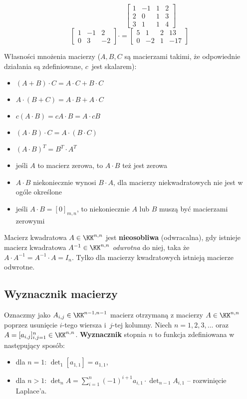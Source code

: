 $$
\hspace{6em} \begin{bmatrix}
    1 & -1 & 1 & 2 \\
    2 & 0 & 1 & 3 \\
    3 & 1 & 1 & 4
\end{bmatrix}
$$
$$
\begin{bmatrix}
    1 & -1 & 2 \\
    0 & 3 & -2
\end{bmatrix}\cdot = 
\begin{bmatrix}
    5 & 1 & 2 & 13 \\
    0 & -2 & 1 & -17
\end{bmatrix}
$$

Własności mnożenia macierzy ($A, B, C$ są macierzami takimi, że odpowiednie działania są zdefiniowane, $c$~jest skalarem):
\begin{itemize}
    \item $(A + B)\cdot C = A\cdot C + B \cdot C$
    \item $A\cdot(B+C)=A\cdot B + A\cdot C$
    \item $c(A\cdot B) = cA \cdot B = A \cdot cB$
    \item $(A\cdot B)\cdot C = A\cdot(B\cdot C)$
    \item $(A\cdot B)^T = B^T\cdot A^T$
    \item jeśli $A$ to macierz zerowa, to $A\cdot B$ też jest zerowa
    \item $A\cdot B$ niekoniecznie wynosi $B\cdot A$, dla macierzy niekwadratowych nie jest w ogóle określone
    \item jeśli $A\cdot B = [0]_{m,n}$, to niekoniecznie $A$ lub $B$ muszą być macierzami zerowymi
\end{itemize}

Macierz kwadratowa $A \in \KK^{n,n}$ jest \textbf{nieosobliwa} (odwracalna), gdy istnieje macierz kwadratowa $A^{-1} \in \KK^{n,n}$ \textit{odwrotna} do niej, taka że $A \cdot A^{-1} = A^{-1} \cdot A = I_n$. Tylko dla macierzy kwadratowych istnieją macierze odwrotne.

\subsection{Wyznacznik macierzy}
Oznaczmy jako $A_{i,j} \in \KK^{n-1, n-1}$ macierz otrzymaną z macierzy $A \in \KK^{n, n}$ poprzez usunięcie $i$-tego wiersza i~$j$-tej kolumny. Niech $n=1,2,3,\dots$ oraz $A=[a_{i,j}]_{i,j=1}^n\in\KK^{n,n}$. \textbf{Wyznacznik} stopnia $n$ to funkcja  zdefiniowana w następujący sposób:
\begin{itemize}
    \item dla $n=1$: $\det_1[a_{1,1}]=a_{1,1}$,
    \item dla $n>1$: $\det_nA=\sum_{i=1}^n(-1)^{i+1}a_{i,1}\cdot \det_{n-1}A_{i,1}$ -- rozwinięcie Laplace'a.
\end{itemize}

